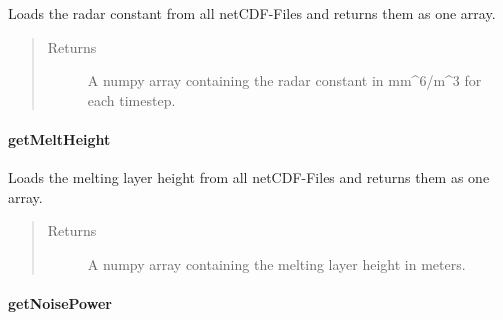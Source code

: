 \documentclass[letterpaper,10pt,english]{sphinxmanual}
\begin{document}
\begin{fulllineitems}
\begin{fulllineitems}
\label{\detokenize{generated/MPPy.Instruments.Radar.Radar.getRadarConstant:MPPy.Instruments.Radar.Radar.getRadarConstant}}
Loads the radar constant from all netCDF-Files and returns them as one array.
\begin{quote}\begin{description}
\item[{Returns}] \leavevmode
A numpy array containing the radar constant in mm\textasciicircum{}6/m\textasciicircum{}3 for each timestep.

\end{description}\end{quote}

\end{fulllineitems}



\paragraph{getMeltHeight}
\label{\detokenize{generated/MPPy.Instruments.Radar.Radar.getMeltHeight:getmeltheight}}\label{\detokenize{generated/MPPy.Instruments.Radar.Radar.getMeltHeight::doc}}

\begin{fulllineitems}
\label{\detokenize{generated/MPPy.Instruments.Radar.Radar.getMeltHeight:MPPy.Instruments.Radar.Radar.getMeltHeight}}
Loads the melting layer height from all netCDF-Files and returns them as one array.
\begin{quote}\begin{description}
\item[{Returns}] \leavevmode
A numpy array containing the melting layer height in meters.

\end{description}\end{quote}

\end{fulllineitems}



\paragraph{getNoisePower}
\label{\detokenize{generated/MPPy.Instruments.Radar.Radar.getNoisePower::doc}}\label{\detokenize{generated/MPPy.Instruments.Radar.Radar.getNoisePower:getnoisepower}}


\end{fulllineitems}
\end{document}
